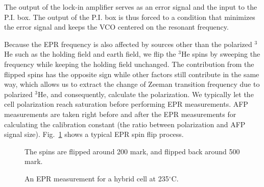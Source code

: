 The output of the lock-in amplifier serves as an error signal and the input to the P.I. box. The output of the P.I. box is thus forced to a condition that minimizes the error signal and keeps the VCO centered on the resonant frequency.

Because the EPR frequency is also affected by sources other than the polarized $^{3}$He such as the holding field and earth field, we flip the $^{3}$He spins by sweeping the frequency while keeping the holding field unchanged. The contribution from the flipped spins has the opposite sign while other factors still contribute in the same way, which allows us to extract the change of Zeeman transition frequency due to polarized $^{3}$He, and consequently, calculate the polarization. We typically let the cell polarization reach saturation before performing EPR measurements. AFP measurements are taken right before and after the EPR measurements for calculating the calibration constant (the ratio between polarization and AFP signal size). Fig.~\ref{epr} shows a typical EPR spin flip process.

\begin{figure}[t!]
	\centering
	\caption{{ An EPR measurement for a hybrid cell at 235$^{\circ}$C.}} The spins are flipped around 200 mark, and flipped back around 500 mark.
	\label{epr}
\end{figure}

